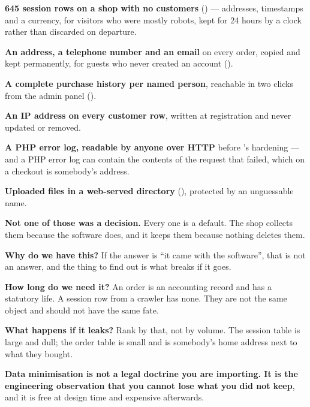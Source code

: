 \begin{examplebox}
\begin{tight}
  \item \textbf{645 session rows on a shop with no customers}
        () --- addresses, timestamps and a currency, for visitors
        who were mostly robots, kept for 24 hours by a clock rather than
        discarded on departure.
  \item \textbf{An address, a telephone number and an email} on every order,
        copied and kept permanently, for guests who never created an account
        ().
  \item \textbf{A complete purchase history per named person}, reachable in
        two clicks from the admin panel ().
  \item \textbf{An IP address on every customer row}, written at registration
        and never updated or removed.
  \item \textbf{A PHP error log, readable by anyone over HTTP} before
        's hardening --- and a PHP error log can contain the
        contents of the request that failed, which on a checkout is somebody's
        address.
  \item \textbf{Uploaded files in a web-served directory}
        (), protected by an unguessable name.
\end{tight}

\smallskip
\textbf{Not one of those was a decision.} Every one is a default. The shop
collects them because the software does, and it keeps them because nothing
deletes them.
\end{examplebox}

\begin{conceptbox}
\begin{tightnum}
  \item \textbf{Why do we have this?} If the answer is ``it came with the
        software'', that is not an answer, and the thing to find out is what
        breaks if it goes.
  \item \textbf{How long do we need it?} An order is an accounting record and
        has a statutory life. A session row from a crawler has none. They are
        not the same object and should not have the same fate.
  \item \textbf{What happens if it leaks?} Rank by that, not by volume. The
        session table is large and dull; the order table is small and is
        somebody's home address next to what they bought.
\end{tightnum}

\smallskip
\textbf{Data minimisation is not a legal doctrine you are importing. It is the
engineering observation that you cannot lose what you did not keep}, and it is
free at design time and expensive afterwards.
\end{conceptbox}

